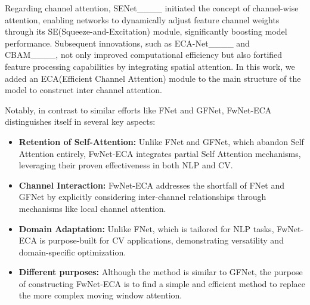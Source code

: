 Regarding channel attention, SENet____ initiated the concept of channel-wise attention, enabling networks to dynamically adjust feature channel weights through its SE(Squeeze-and-Excitation) module, significantly boosting model performance. Subsequent innovations, such as ECA-Net____ and CBAM____, not only improved computational efficiency but also fortified feature processing capabilities by integrating spatial attention. In this work, we added an ECA(Efficient Channel Attention) module to the main structure of the model to construct inter channel attention.

Notably, in contrast to similar efforts like FNet and GFNet, FwNet-ECA distinguishes itself in several key aspects:
\begin{itemize}
\item \textbf{Retention of Self-Attention:} Unlike FNet and GFNet, which abandon Self Attention entirely, FwNet-ECA integrates partial Self Attention mechanisms, leveraging their proven effectiveness in both NLP and CV.
\item 	\textbf{Channel Interaction:} FwNet-ECA addresses the shortfall of FNet and GFNet by explicitly considering inter-channel relationships through mechanisms like local channel attention.
\item 	\textbf{Domain Adaptation:} Unlike FNet, which is tailored for NLP tasks, FwNet-ECA is purpose-built for CV applications, demonstrating versatility and domain-specific optimization.
\item 	\textbf{Different purposes:} Although the method is similar to GFNet, the purpose of constructing FwNet-ECA is to find a simple and efficient method to replace the more complex moving window attention.
\end{itemize}